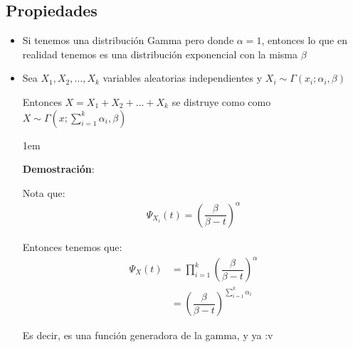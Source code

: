 \documentclass[12pt, fleqn]{report}                             %
\newenvironment{SmallIndentation}[1][0.75em]                    %
        {\begin{adjustwidth}{#1}{}\begin{footnotesize}}             %
        {\end{footnotesize}\end{adjustwidth}}                       %
\theoremstyle{break}                                            %
\newcommand{\Wrap}[1]{\left( #1 \right)}                        %
\begin{document}
            \subsection{Propiedades}

                \begin{itemize}

                    \item
                        Si tenemos una distribución Gamma pero donde $\alpha = 1$, entonces lo que
                        en realidad tenemos es una distribución exponencial con la misma $\beta$

                    \item 
                        Sea $X_1, X_2, \dots, X_k$ variables aleatorias independientes
                        y $X_i \sim \Gamma(x_i; \alpha_i, \beta)$ 

                        Entonces $X = X_1 + X_2 + \dots + X_k$ se distruye como
                        como $X \sim \Gamma(x; \sum_{i=1}^k \alpha_i, \beta)$

                        \begin{SmallIndentation}[1em]
                            \textbf{Demostración}:

                            Nota que:
                            \begin{align*}
                                \Psi_{X_i}(t) = \Wrap{\dfrac{\beta}{\beta - t}}^\alpha
                            \end{align*}

                            Entonces tenemos que:
                            \begin{align*}
                                \Psi_{X}(t) 
                                    &= \prod_{i=1}^k \Wrap{\dfrac{\beta}{\beta - t}}^\alpha      \\
                                    &= \Wrap{\dfrac{\beta}{\beta - t}}^{\sum_{i=1}^k \alpha_i }     
                            \end{align*}

                            Es decir, es una función generadora de la gamma, y ya :v
                        
                        \end{SmallIndentation}

                \end{itemize}
 
\end{document}
